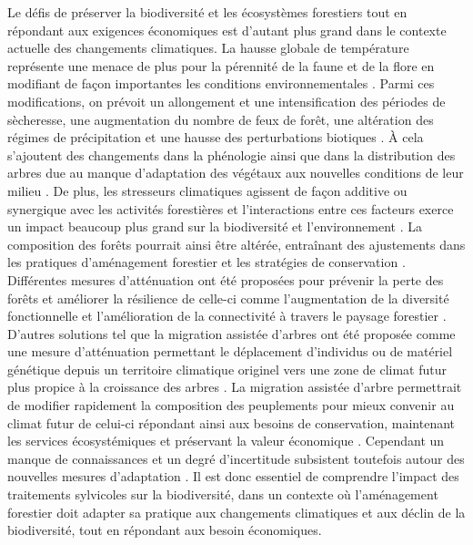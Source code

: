 Le défis de préserver la biodiversité et les écosystèmes forestiers tout en répondant aux exigences économiques est d'autant plus grand dans le contexte actuelle des changements climatiques. 
La hausse globale de température représente une menace de plus pour la pérennité de la faune et de la flore en modifiant de façon importantes les conditions environnementales \citep{McKenney2009Climatechange,Trumbore2015Foresthealth,Seidl2017Forestdisturbances,Messier2022Warningnatural}. 
Parmi ces modifications, on prévoit un allongement et une intensification des périodes de sècheresse, une augmentation du nombre de feux de forêt, une altération des régimes de précipitation et une hausse des perturbations biotiques \citep{Parmesan2007Influencesspecies,Joyce2013Climatechange,Gatti2021Amazoniacarbon,Heidari2021Effectsclimate}. 
À cela s'ajoutent des changements dans la phénologie ainsi que dans la distribution des arbres due au manque d'adaptation des végétaux aux nouvelles conditions de leur milieu \citep{Aitken2008Adaptationmigration,Chuine2010Whydoes,Zhu2012Failuremigrate,Gray2013Trackingsuitable}.
De plus, les stresseurs climatiques agissent de façon additive ou synergique avec les activités forestières et l'interactions entre ces facteurs exerce un impact beaucoup plus grand sur la biodiversité et l'environnement \citep{Brook2008Synergiesextinctiona,Tremblay2018Harvestinginteracts,Ochs2022Responseterrestrial,Bouderbala2023Longtermeffect}. 
La composition des forêts pourrait ainsi être altérée, entraînant des ajustements dans les pratiques d'aménagement forestier et les stratégies de conservation \citep{McKenney2009Climatechange,Chmura2011Forestresponses,Lo2011Linkingclimate}.
Différentes mesures d'atténuation ont été proposées pour prévenir la perte des forêts et améliorer la résilience de celle-ci comme l'augmentation de la diversité fonctionnelle et l'amélioration de la connectivité à travers le paysage forestier \citep{Messier2019functionalcomplex}.
D'autres solutions tel que la migration assistée d'arbres ont été proposée comme une mesure d'atténuation permettant le déplacement d'individus ou de matériel génétique depuis un territoire climatique originel vers une zone de climat futur plus propice à la croissance des arbres \citep{Vitt2010Assistedmigration,Dumroese2015Considerationsrestoring,Park2018Informationunderload,Park2023Provenancetrials}. 
La migration assistée d'arbre permettrait de modifier rapidement la composition des peuplements pour mieux convenir au climat futur de celui-ci répondant ainsi aux besoins de conservation, maintenant les services écosystémiques et préservant la valeur économique \citep{Pedlar2011implementationassisted,Ste-Marie2011Assistedmigration,Winder2011Ecologicalimplications}.
Cependant un manque de connaissances et un degré d'incertitude subsistent toutefois autour des nouvelles mesures d'adaptation \citep{Klenk2015assistedmigration,Park2018Informationunderload}. 
Il est donc essentiel de comprendre l'impact des traitements sylvicoles sur la biodiversité, dans un contexte où l'aménagement forestier doit adapter sa pratique aux changements climatiques et aux déclin de la biodiversité, tout en répondant aux besoin économiques.



